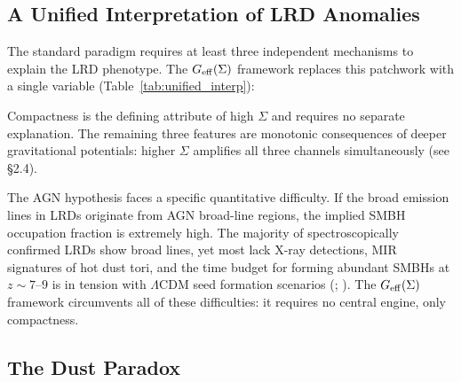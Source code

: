 \documentclass[apj,twocolumn,longbibliography,linenumbers]{aastex701}
\begin{document}
\subsection{A Unified Interpretation of LRD Anomalies}

The standard paradigm requires at least three independent mechanisms to explain the LRD phenotype. The $G_{\rm eff}(\Sigma)$ framework replaces this patchwork with a single variable (Table~\ref{tab:unified_interp}):

\begin{table}[h]
\caption{Unified Interpretation of LRD Anomalies}
\label{tab:unified_interp}
\centering
\small
{}
\end{table}

Compactness is the defining attribute of high $\Sigma$ and requires no separate explanation. The remaining three features are monotonic consequences of deeper gravitational potentials: higher $\Sigma$ amplifies all three channels simultaneously (see \S2.4).

The AGN hypothesis faces a specific quantitative difficulty. If the broad emission lines in LRDs originate from AGN broad-line regions, the implied SMBH occupation fraction is extremely high. The majority of spectroscopically confirmed LRDs show broad lines, yet most lack X-ray detections, MIR signatures of hot dust tori, and the time budget for forming abundant SMBHs at $z \sim 7$--$9$ is in tension with $\Lambda$CDM seed formation scenarios (\citealt{Volonteri2010}; \citealt{Latif2016}). The $G_{\rm eff}(\Sigma)$ framework circumvents all of these difficulties: it requires no central engine, only compactness.

\subsection{The Dust Paradox}
\end{document}
